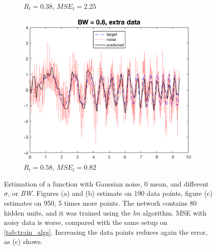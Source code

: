 \documentclass[a4paper, 10pt]{article}
\begin{document}
\begin{figure}[h]
\begin{adjustwidth}{-1.1cm}{-1.1cm}
\begin{subfigure}[t]{0.30\linewidth}
        \caption{$R_t=0.38$, $MSE_t=2.25$}
        \label{fig:noise_big}
      \end{subfigure}
      \begin{subfigure}[t]{0.3\linewidth}
        \includegraphics[width=1\linewidth]{./lab1/noise_8e-1_extra.png}
        \caption{$R_t=0.58$, $MSE_t=0.82$}
        \label{fig:noise_more_data}
      \end{subfigure}
      \end{adjustwidth}
      \caption{Estimation of a function with Gaussian noise, 0 mean, and different
        $\sigma$, or \emph{BW}. Figures (a) and (b) estimate on 190 data points, 
        figure (c) estimates on 950, 5 times more points. The network contains 80 
        hidden units, and it was trained using the \emph{lm} algorithm. MSE 
        with noisy data is worse, compared with the same setup on 
        \autoref{tab:train_algs}. Increasing the data points reduces again the 
        error, as (c) shows.}
      \label{fig:noise}
    \end{figure}
\end{document}
